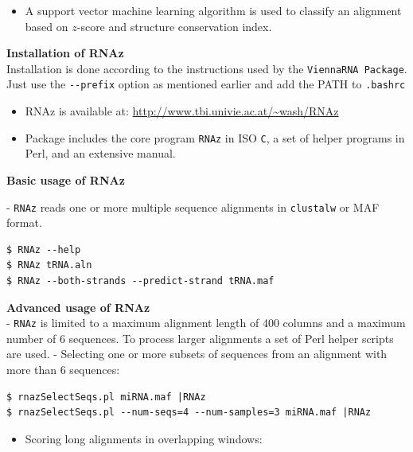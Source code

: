 \documentclass[]{article}
\providecommand{\tightlist}{%
  \setlength{\itemsep}{0pt}\setlength{\parskip}{0pt}}
\begin{document}
\begin{itemize}
\tightlist
\item
  A support vector machine learning algorithm is used to classify an
  alignment based on \(z\)-score and structure conservation index.
\end{itemize}

\textbf{Installation of RNAz}\\
Installation is done according to the instructions used by the
\texttt{ViennaRNA\ Package}. Just use the \texttt{-\/-prefix} option as
mentioned earlier and add the PATH to \texttt{.bashrc}

\begin{itemize}
\tightlist
\item
  RNAz is available at:
  \href{http://www.tbi.univie.ac.at/\%7Ewash/RNAz}{http://www.tbi.univie.ac.at/\textasciitilde{}wash/RNAz}
\item
  Package includes the core program \texttt{RNAz} in ISO \texttt{C}, a
  set of helper programs in Perl, and an extensive manual.
\end{itemize}

\textbf{Basic usage of RNAz}\\
  - \texttt{RNAz} reads one or more multiple sequence
alignments in \texttt{clustalw} or MAF format.

\begin{verbatim}
$ RNAz --help
$ RNAz tRNA.aln
$ RNAz --both-strands --predict-strand tRNA.maf
\end{verbatim}

\textbf{Advanced usage of RNAz}\\
- \texttt{RNAz} is limited to a maximum alignment length of 400 columns
and a maximum number of 6 sequences. To process larger alignments a set
of Perl helper scripts are used. - Selecting one or more subsets of
sequences from an alignment with more than 6 sequences:

\begin{verbatim}
$ rnazSelectSeqs.pl miRNA.maf |RNAz
$ rnazSelectSeqs.pl --num-seqs=4 --num-samples=3 miRNA.maf |RNAz
\end{verbatim}

\begin{itemize}
\tightlist
\item
  Scoring long alignments in overlapping windows:
\end{itemize}
\end{document}
